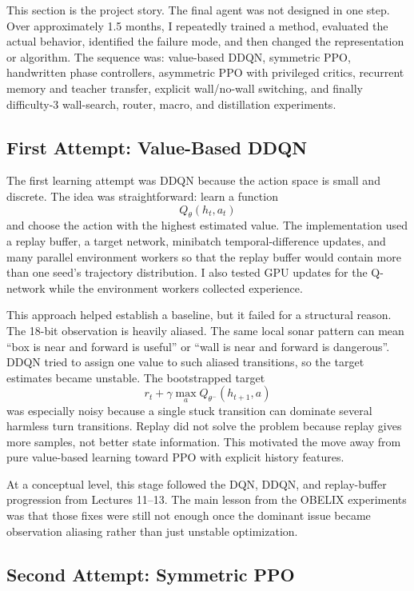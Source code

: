 \documentclass[11pt]{article}
\begin{document}
This section is the project story. The final agent was not designed in one step. Over
approximately 1.5 months, I repeatedly trained a method, evaluated the actual behavior,
identified the failure mode, and then changed the representation or algorithm. The
sequence was: value-based DDQN, symmetric PPO, handwritten phase controllers,
asymmetric PPO with privileged critics, recurrent memory and teacher transfer, explicit
wall/no-wall switching, and finally difficulty-3 wall-search, router, macro, and
distillation experiments.

\subsection{First Attempt: Value-Based DDQN}

The first learning attempt was DDQN because the action space is small and discrete. The
idea was straightforward: learn a function
\[
  Q_\theta(h_t,a_t)
\]
and choose the action with the highest estimated value. The implementation used a replay
buffer, a target network, minibatch temporal-difference updates, and many parallel
environment workers so that the replay buffer would contain more than one seed's
trajectory distribution. I also tested GPU updates for the Q-network while the
environment workers collected experience.

This approach helped establish a baseline, but it failed for a structural reason. The
18-bit observation is heavily aliased. The same local sonar pattern can mean ``box is
near and forward is useful'' or ``wall is near and forward is dangerous''. DDQN tried to
assign one value to such aliased transitions, so the target estimates became unstable.
The bootstrapped target
\[
  r_t + \gamma \max_a Q_{\theta^-}(h_{t+1},a)
\]
was especially noisy because a single stuck transition can dominate several harmless
turn transitions. Replay did not solve the problem because replay gives more samples,
not better state information. This motivated the move away from pure value-based
learning toward PPO with explicit history features.

At a conceptual level, this stage followed the DQN, DDQN, and replay-buffer progression
from Lectures 11--13. The main lesson from the OBELIX experiments was that those fixes
were still not enough once the dominant issue became observation aliasing rather than
just unstable optimization.

\subsection{Second Attempt: Symmetric PPO}
\end{document}
